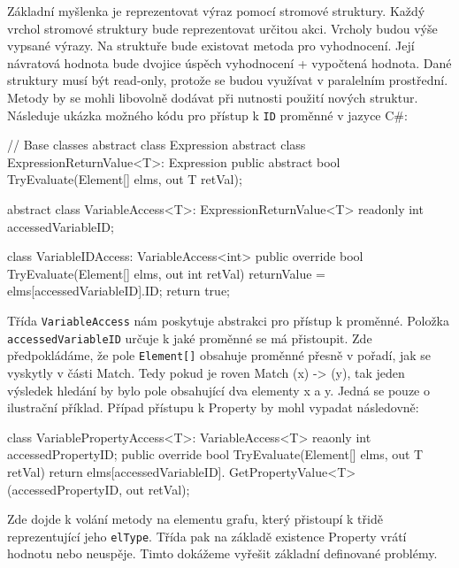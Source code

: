 Základní myšlenka je reprezentovat výraz pomocí stromové struktury. 
Každý vrchol stromové struktury bude reprezentovat určitou akci.
Vrcholy budou výše vypsané výrazy. 
Na struktuře bude existovat metoda pro vyhodnocení.
Její návratová hodnota bude dvojice úspěch vyhodnocení + vypočtená hodnota. 
Dané struktury musí být read-only, protože se budou využívat v paralelním prostřední.
Metody by se mohli libovolně dodávat při nutnosti použití nových struktur. 
Následuje ukázka možného kódu pro přístup k \verb+ID+ proměnné v jazyce C\#:
\begin{code}
// Base classes
abstract class Expression { }
abstract class ExpressionReturnValue<T>: Expression {
  public abstract bool TryEvaluate(Element[] elms, out T retVal); 
}

abstract class VariableAccess<T>: ExpressionReturnValue<T> {
     readonly int accessedVariableID; 
}

class VariableIDAccess: VariableAccess<int> {
  public override bool TryEvaluate(Element[] elms, out int retVal) {
     returnValue = elms[accessedVariableID].ID;
     return true; }}
\end{code}
Třída \verb+VariableAccess+ nám poskytuje abstrakci pro přístup k proměnné.
Položka \verb+accessedVariableID+ určuje k jaké proměnné se má přistoupit.
Zde předpokládáme, že pole \verb+Element[]+ obsahuje proměnné přesně v pořadí, jak se vyskytly v části Match.
Tedy pokud je roven Match (x) -> (y), tak jeden výsledek hledání by bylo pole obsahující dva elementy x a y.
Jedná se pouze o ilustrační příklad. 
Případ přístupu k Property by mohl vypadat následovně:
\begin{code}
class VariablePropertyAccess<T>: VariableAccess<T> {
  reaonly int accessedPropertyID; 
  public override bool TryEvaluate(Element[] elms, out T retVal) {
    return elms[accessedVariableID].
               GetPropertyValue<T>(accessedPropertyID, out retVal);
  }
}
\end{code}
Zde dojde k volání metody na elementu grafu, který přistoupí k třidě reprezentující jeho \verb+elType+.
Třída pak na základě existence Property vrátí hodnotu nebo neuspěje.
Timto dokážeme vyřešit základní definované problémy.

